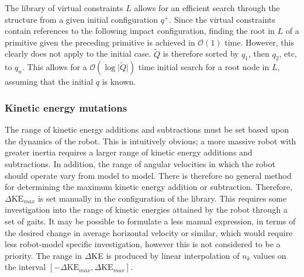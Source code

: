 The library of virtual constraints $L$ allows for an efficient search through the structure from a given initial configuration $q^+$. Since the virtual constraints contain references to the following impact configuration, finding the root in $L$ of a primitive given the preceding primitive is achieved in $\mathcal{O}(1)$ time. However, this clearly does not apply to the initial case. $\tilde{Q}$ is therefore sorted by $q_1$, then $q_2$, etc, to $q_n$. This allows for a $\mathcal{O}(\log\lvert\tilde{Q}\rvert)$ time initial search for a root node in $L$, assuming that the initial $q$ is known.

\subsubsection{Kinetic energy mutations}
The range of kinetic energy additions and subtractions must be set based upon the dynamics of the robot. This is intuitively obvious; a more massive robot with greater inertia requires a larger range of kinetic energy additions and subtractions. In addition, the range of angular velocities in which the robot should operate vary from model to model. There is therefore no general method for determining the maximum kinetic energy addition or subtraction. Therefore, $\Delta\mathrm{KE}_{max}$ is set manually in the configuration of the library. This requires some investigation into the range of kinetic energies attained by the robot through a set of gaits. It may be possible to formulate a less manual expression, in terms of the desired change in average horizontal velocity or similar, which would require less robot-model specific investigation, however this is not considered to be a priority. The range in $\Delta$KE is produced by linear interpolation of $n_k$ values on the interval $[-\Delta\mathrm{KE}_{max},\Delta\mathrm{KE}_{max}]$.

